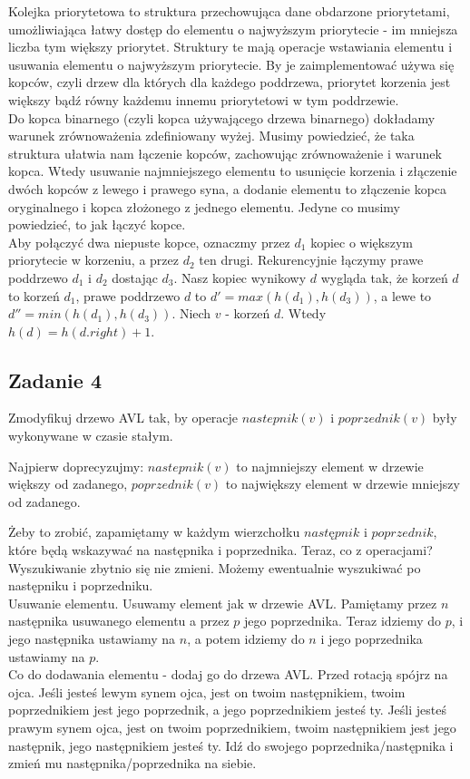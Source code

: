 \documentclass[a4paper]{article}
\begin{document}
Kolejka priorytetowa to struktura przechowująca dane obdarzone priorytetami, umożliwiająca łatwy dostęp do elementu o najwyższym priorytecie - im mniejsza liczba tym większy priorytet. Struktury te mają operacje wstawiania elementu i usuwania elementu o najwyższym priorytecie. By je zaimplementować używa się kopców, czyli drzew dla których dla każdego poddrzewa, priorytet korzenia jest większy bądź równy każdemu innemu priorytetowi w tym poddrzewie.\\
Do kopca binarnego (czyli kopca używającego drzewa binarnego) dokładamy warunek zrównoważenia zdefiniowany wyżej. Musimy powiedzieć, że taka struktura ułatwia nam łączenie kopców, zachowując zrównoważenie i warunek kopca. Wtedy usuwanie najmniejszego elementu to usunięcie korzenia i złączenie dwóch kopców z lewego i prawego syna, a dodanie elementu to złączenie kopca oryginalnego i kopca złożonego z jednego elementu. Jedyne co musimy powiedzieć, to jak łączyć kopce.\\
Aby połączyć dwa niepuste kopce, oznaczmy przez $d_1$ kopiec o większym priorytecie w korzeniu, a przez $d_2$ ten drugi. Rekurencyjnie łączymy prawe poddrzewo $d_1$ i $d_2$ dostając $d_3$. Nasz kopiec wynikowy $d$ wygląda tak, że korzeń $d$ to korzeń $d_1$, prawe poddrzewo $d$ to $d'=max(h(d_1),h(d_3))$, a lewe to $d''=min(h(d_1),h(d_3))$. Niech $v$ - korzeń $d$. Wtedy $h(d)=h(d.right)+1$.

\subsection*{Zadanie 4}
Zmodyfikuj drzewo AVL tak, by operacje $nastepnik(v)$ i $poprzednik(v)$ były wykonywane w czasie stałym.

Najpierw doprecyzujmy: $nastepnik(v)$ to najmniejszy element w drzewie większy od zadanego, $poprzednik(v)$ to największy element w drzewie mniejszy od zadanego.

Żeby to zrobić, zapamiętamy w każdym wierzchołku $następnik$ i $poprzednik$, które będą wskazywać na następnika i poprzednika. Teraz, co z operacjami? Wyszukiwanie zbytnio się nie zmieni. Możemy ewentualnie wyszukiwać po następniku i poprzedniku.\\
Usuwanie elementu. Usuwamy element jak w drzewie AVL. Pamiętamy przez $n$ następnika usuwanego elementu a przez $p$ jego poprzednika. Teraz idziemy do $p$, i jego następnika ustawiamy na $n$, a potem idziemy do $n$ i jego poprzednika ustawiamy na $p$.\\
Co do dodawania elementu - dodaj go do drzewa AVL. Przed rotacją spójrz na ojca. Jeśli jesteś lewym synem ojca, jest on twoim następnikiem, twoim poprzednikiem jest jego poprzednik, a jego poprzednikiem jesteś ty. Jeśli jesteś prawym synem ojca, jest on twoim poprzednikiem, twoim następnikiem jest jego następnik, jego następnikiem jesteś ty. Idź do swojego poprzednika/następnika i zmień mu następnika/poprzednika na siebie.\\
\end{document}
